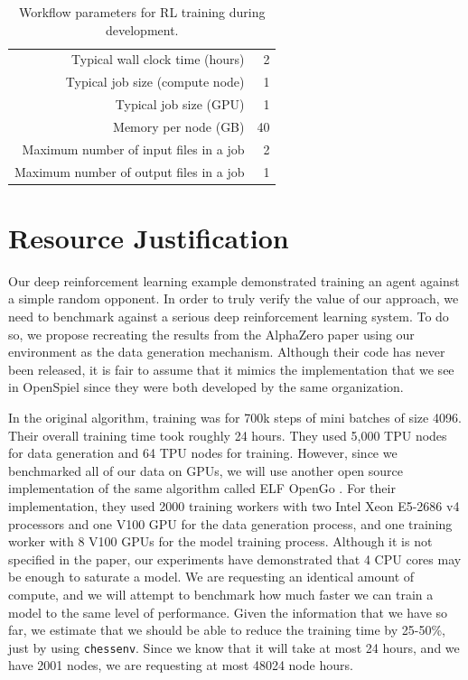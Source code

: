 \documentclass[12pt]{article}
\begin{document}
\begin{table}[H]
    \centering
    \begin{tabular}{rr}
        \hline\hline
        Typical wall clock time (hours) & 2 \\
        Typical job size (compute node)  & 1  \\
        Typical job size (GPU) & 1  \\
        Memory per node (GB) & 40  \\
        Maximum number of input files in a job & 2 \\
        Maximum number of output files in a job & 1  \\
        \hline\hline
    \end{tabular}
    \caption{Workflow parameters for RL training during development.}
    \label{table:workflow_parameters}
\end{table}

\section{Resource Justification}\label{sec:resource-justification}

Our deep reinforcement learning example demonstrated training an agent against a simple random opponent. In order to truly verify the value of our approach, we need to benchmark against a serious deep reinforcement learning system. To do so, we propose recreating the results from the AlphaZero paper using our environment as the data generation mechanism. Although their code has never been released, it is fair to assume that it mimics the implementation that we see in OpenSpiel since they were both developed by the same organization. 

In the original algorithm, training was for 700k steps of mini batches of size 4096. Their overall training time took roughly 24 hours. They used 5,000 TPU nodes for data generation and 64 TPU nodes for training. However, since we benchmarked all of our data on GPUs, we will use another open source implementation of the same algorithm called ELF OpenGo \cite{opengo}. For their implementation, they used 2000 training workers with two Intel Xeon E5-2686 v4 processors and one V100 GPU for the data generation process, and one training worker with 8 V100 GPUs for the model training process. Although it is not specified in the paper, our experiments have demonstrated that 4 CPU cores may be enough to saturate a model. We are requesting an identical amount of compute, and we will attempt to benchmark how much faster we can train a model to the same level of performance. Given the information that we have so far, we estimate that we should be able to reduce the training time by 25-50\%, just by using \texttt{chessenv}. Since we know that it will take at most 24 hours, and we have 2001 nodes, we are requesting at most 48024 node hours.



\end{document}
